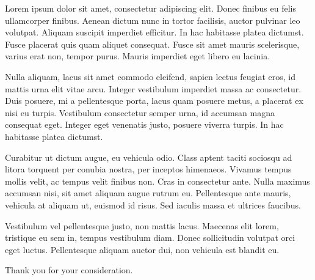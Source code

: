 \documentclass{ReCeiVe}         %
\begin{document}
\makecvheader[L]
\makelettertitle[R]

\begin{cvletter}
Lorem ipsum dolor sit amet, consectetur adipiscing elit. Donec finibus eu felis ullamcorper finibus. Aenean dictum nunc in tortor facilisis, auctor pulvinar leo volutpat. Aliquam suscipit imperdiet efficitur. In hac habitasse platea dictumst. Fusce placerat quis quam aliquet consequat. Fusce sit amet mauris scelerisque, varius erat non, tempor purus. Mauris imperdiet eget libero eu lacinia. \par\bigskip

Nulla aliquam, lacus sit amet commodo eleifend, sapien lectus feugiat eros, id mattis urna elit vitae arcu. Integer vestibulum imperdiet massa ac consectetur. Duis posuere, mi a pellentesque porta, lacus quam posuere metus, a placerat ex nisi eu turpis. Vestibulum consectetur semper urna, id accumsan magna consequat eget. Integer eget venenatis justo, posuere viverra turpis. In hac habitasse platea dictumst. \par\bigskip

Curabitur ut dictum augue, eu vehicula odio. Class aptent taciti sociosqu ad litora torquent per conubia nostra, per inceptos himenaeos. Vivamus tempus mollis velit, ac tempus velit finibus non. Cras in consectetur ante. Nulla maximus accumsan nisi, sit amet aliquam augue rutrum eu. Pellentesque ante mauris, vehicula at aliquam ut, euismod id risus. Sed iaculis massa et ultrices faucibus. \par\bigskip

Vestibulum vel pellentesque justo, non mattis lacus. Maecenas elit lorem, tristique eu sem in, tempus vestibulum diam. Donec sollicitudin volutpat orci eget luctus. Pellentesque aliquam auctor dui, non vehicula est blandit eu. \par\bigskip 

Thank you for your consideration. \par\bigskip
\end{cvletter}

\makeletterclosing %
\end{document}
